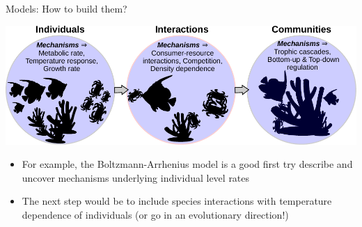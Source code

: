 \documentclass[xcolor=x11names,handout,compress]{beamer}
\renewcommand{\(}{\begin{columns}}
\renewcommand{\)}{\end{columns}}
\newcommand{\<}[1]{\begin{column}{#1}}
\renewcommand{\>}{\end{column}}
\begin{document}
\begin{frame}{Models: How to build them?}

\begin{center}
	 \includegraphics[width=\textwidth]{Mechanisms.pdf}
\end{center} 

\begin{itemize}\itemsep10pt

	\item For example, the Boltzmann-Arrhenius model is a good first try 
	describe and uncover mechanisms underlying individual level rates  

	\item The next step would be to include species interactions with  
	temperature dependence of individuals (or go in an evolutionary direction!)

\end{itemize}   



\end{frame}




	

\end{document}
